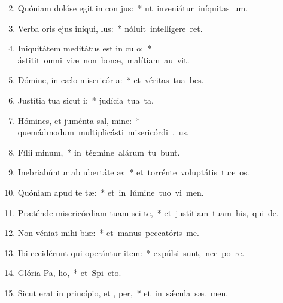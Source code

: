 \begin{flushleft}
\begin{enumerate}[leftmargin=*]
\setcounter{enumi}{1}

\item Quóniam dolóse egit in con jus:~* \mbox{ut inveniátur iníquitas   um.}
\item Verba oris ejus iníqui,  lus:~* \mbox{nóluit intellígere   ret.}
\item Iniquitátem meditátus est in cu o:~* \mbox{ástitit omni viæ non bonæ, malítiam au  vit.}
\item Dómine, in cælo misericór a:~* \mbox{et véritas tua   bes.}
\item Justítia tua sicut  i:~* \mbox{judícia tua  ta.}
\item Hómines, et juménta sal, mine:~* \mbox{quemádmodum multiplicásti misericórdi , us,}
\item Fílii  minum,~* \mbox{in tégmine alárum tu bunt.}
\item Inebriabúntur ab ubertáte  æ:~* \mbox{et torrénte voluptátis tuæ  os.}
\item Quóniam apud te   tæ:~* \mbox{et in lúmine tuo vi men.}
\item Præténde misericórdiam tuam sci te,~* \mbox{et justítiam tuam his, qui   de.}
\item Non véniat mihi  biæ:~* \mbox{et manus peccatóris   me.}
\item Ibi cecidérunt qui operántur item:~* \mbox{expúlsi sunt, nec po re.}
\item Glória Pa,  lio,~* \mbox{et Spi cto.}
\item Sicut erat in princípio, et ,  per,~* \mbox{et in s\'{\ae}cula sæ. men.}

\end{enumerate}
\end{flushleft}

